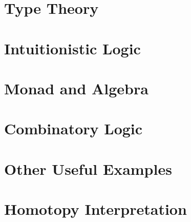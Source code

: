 \documentclass[12pt,a4paper]{report}
\begin{document}
\chapter{Type Theory}
\label{type-theory}
\chapter{Intuitionistic Logic}
\label{intuitionistic-logic}
\chapter{Monad and Algebra}
\label{monad-algebra}

\chapter{Combinatory Logic}
\label{combinatory-logic}

\chapter{Other Useful Examples}
\label{monad-examples}

\chapter{Homotopy Interpretation}
\label{HoTT}



\end{document}
